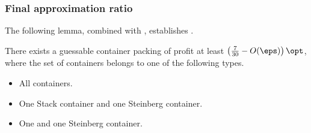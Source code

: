\subsubsection{Final approximation ratio}

The following lemma, combined with , establishes .

\begin{lemma}
    There exists a guessable container packing of profit at least $\left(\frac{7}{30}-O(\eps)\right)\opt$, where the set of containers belongs to one of the following types.
    \begin{itemize}
        \item All  containers.
        \item One Stack container and one Steinberg container.
        \item One \LContainer{} and one Steinberg container.
    \end{itemize}
\end{lemma}
